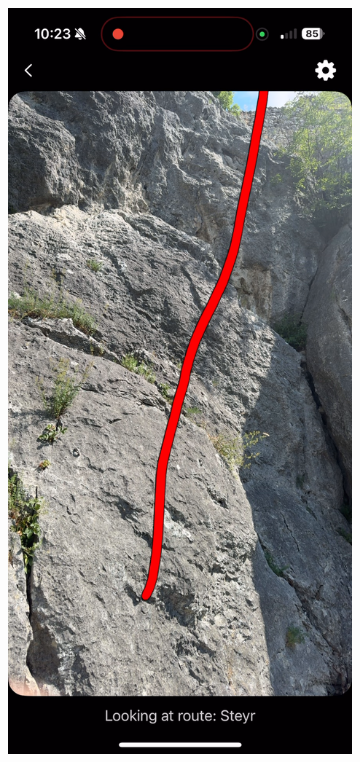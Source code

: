 \begin{figure}[H]
    \centering
    \begin{subfigure}[b]{0.45\textwidth}
        \centering
        \includegraphics[width=\textwidth]{images/testiranje/steyr_bad_detection_before_moving.png}

\end{subfigure}
\end{figure}
